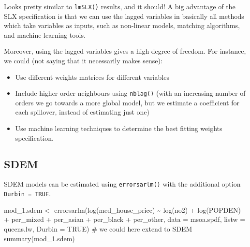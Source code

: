 \documentclass[
  letterpaper,
  DIV=11,
  numbers=noendperiod]{scrreprt}
\newenvironment{Shaded}{\begin{snugshade}}{\end{snugshade}}
\newcommand{\AttributeTok}[1]{\textcolor[rgb]{0.40,0.45,0.13}{#1}}
\newcommand{\CommentTok}[1]{\textcolor[rgb]{0.37,0.37,0.37}{#1}}
\newcommand{\ConstantTok}[1]{\textcolor[rgb]{0.56,0.35,0.01}{#1}}
\newcommand{\FunctionTok}[1]{\textcolor[rgb]{0.28,0.35,0.67}{#1}}
\newcommand{\NormalTok}[1]{\textcolor[rgb]{0.00,0.23,0.31}{#1}}
\newcommand{\OtherTok}[1]{\textcolor[rgb]{0.00,0.23,0.31}{#1}}
\newcommand{\SpecialCharTok}[1]{\textcolor[rgb]{0.37,0.37,0.37}{#1}}
\begin{document}
Looks pretty similar to \texttt{lmSLX()} results, and it should! A big
advantage of the SLX specification is that we can use the lagged
variables in basically all methods which take variables as inputs, such
as non-linear models, matching algorithms, and machine learning tools.

Moreover, using the lagged variables gives a high degree of freedom. For
instance, we could (not saying that it necessarily makes sense):

\begin{itemize}
\item
  Use different weights matrices for different variables
\item
  Include higher order neighbours using \texttt{nblag()} (with an
  increasing number of orders we go towards a more global model, but we
  estimate a coefficient for each spillover, instead of estimating just
  one)
\item
  Use machine learning techniques to determine the best fitting weights
  specification.
\end{itemize}

\hypertarget{sdem}{%
\subsection{SDEM}\label{sdem}}

SDEM models can be estimated using \texttt{errorsarlm()} with the
additional option \texttt{Durbin\ =\ TRUE}.

\begin{Shaded}
\begin{Highlighting}[]
\NormalTok{mod\_1.sdem }\OtherTok{\textless{}{-}} \FunctionTok{errorsarlm}\NormalTok{(}\FunctionTok{log}\NormalTok{(med\_house\_price) }\SpecialCharTok{\textasciitilde{}} \FunctionTok{log}\NormalTok{(no2) }\SpecialCharTok{+} \FunctionTok{log}\NormalTok{(POPDEN) }\SpecialCharTok{+}
\NormalTok{                          per\_mixed }\SpecialCharTok{+}\NormalTok{ per\_asian }\SpecialCharTok{+}\NormalTok{ per\_black }\SpecialCharTok{+}\NormalTok{ per\_other,  }
                        \AttributeTok{data =}\NormalTok{ msoa.spdf, }
                        \AttributeTok{listw =}\NormalTok{ queens.lw,}
                        \AttributeTok{Durbin =} \ConstantTok{TRUE}\NormalTok{) }\CommentTok{\# we could here extend to SDEM}
\FunctionTok{summary}\NormalTok{(mod\_1.sdem)}
\end{Highlighting}
\end{Shaded}
\end{document}
